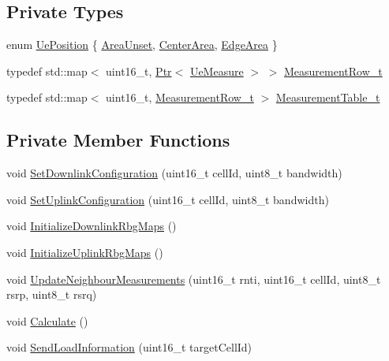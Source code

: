 \subsection*{Private Types}
\begin{DoxyCompactItemize}
\item 
enum \hyperlink{classns3_1_1LteFfrDistributedAlgorithm_a8ff512b8e668c4e56fc5e1bb6c577ad6}{Ue\+Position} \{ \hyperlink{classns3_1_1LteFfrDistributedAlgorithm_a8ff512b8e668c4e56fc5e1bb6c577ad6a4c4c7e985787c181ddf09fd1dcbf84c8}{Area\+Unset}, 
\hyperlink{classns3_1_1LteFfrDistributedAlgorithm_a8ff512b8e668c4e56fc5e1bb6c577ad6ae8ce3c1680b108bb7e87db54e8f0e886}{Center\+Area}, 
\hyperlink{classns3_1_1LteFfrDistributedAlgorithm_a8ff512b8e668c4e56fc5e1bb6c577ad6acfb0117a4a8824dd5c7a08029b774ed3}{Edge\+Area}
 \}
\item 
typedef std\+::map$<$ uint16\+\_\+t, \hyperlink{classns3_1_1Ptr}{Ptr}$<$ \hyperlink{classns3_1_1LteFfrDistributedAlgorithm_1_1UeMeasure}{Ue\+Measure} $>$ $>$ \hyperlink{classns3_1_1LteFfrDistributedAlgorithm_a006ba77bb5533b9fc25640ed35f78d44}{Measurement\+Row\+\_\+t}
\item 
typedef std\+::map$<$ uint16\+\_\+t, \hyperlink{classns3_1_1LteFfrDistributedAlgorithm_a006ba77bb5533b9fc25640ed35f78d44}{Measurement\+Row\+\_\+t} $>$ \hyperlink{classns3_1_1LteFfrDistributedAlgorithm_ac46f79cc3cbb206c7cc80447f7f73a1b}{Measurement\+Table\+\_\+t}
\end{DoxyCompactItemize}
\subsection*{Private Member Functions}
\begin{DoxyCompactItemize}
\item 
void \hyperlink{classns3_1_1LteFfrDistributedAlgorithm_a875fea1c93cac377ea08d6c4fbf922be}{Set\+Downlink\+Configuration} (uint16\+\_\+t cell\+Id, uint8\+\_\+t bandwidth)
\item 
void \hyperlink{classns3_1_1LteFfrDistributedAlgorithm_a4fc74d5978b8aa117236d0cd30bffa54}{Set\+Uplink\+Configuration} (uint16\+\_\+t cell\+Id, uint8\+\_\+t bandwidth)
\item 
void \hyperlink{classns3_1_1LteFfrDistributedAlgorithm_afc1d6435c99e28aa9875e873d27925e3}{Initialize\+Downlink\+Rbg\+Maps} ()
\item 
void \hyperlink{classns3_1_1LteFfrDistributedAlgorithm_ae3d974405e431360172d307415064d23}{Initialize\+Uplink\+Rbg\+Maps} ()
\item 
void \hyperlink{classns3_1_1LteFfrDistributedAlgorithm_a231df7e6a8731c11790643619a1d2858}{Update\+Neighbour\+Measurements} (uint16\+\_\+t rnti, uint16\+\_\+t cell\+Id, uint8\+\_\+t rsrp, uint8\+\_\+t rsrq)
\item 
void \hyperlink{classns3_1_1LteFfrDistributedAlgorithm_ac3060afed89f5404b6626fc0d23d01ae}{Calculate} ()
\item 
void \hyperlink{classns3_1_1LteFfrDistributedAlgorithm_afa2a26377e06993e948eb0aea3c3a717}{Send\+Load\+Information} (uint16\+\_\+t target\+Cell\+Id)
\end{DoxyCompactItemize}
